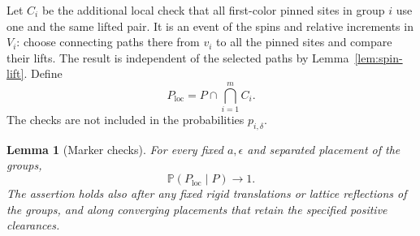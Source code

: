 \documentclass[11pt]{article}
\newcommand{\Prob}{\mathbb P}
\newtheorem{lemma}[theorem]{Lemma}
\theoremstyle{definition}
\theoremstyle{remark}
\numberwithin{equation}{section}
\begin{document}
Let $C_i$ be the additional local check that all first-color pinned
sites in group $i$ use one and the same lifted pair.  It is an event
of the spins and relative increments in $V_i$: choose connecting paths
there from $v_i$ to all the pinned sites and compare their lifts.
The result is independent of the selected paths by
Lemma~\ref{lem:spin-lift}.  Define
\begin{equation}\label{pins:checked-event}
 P_{\mathrm{loc}}=P\cap\bigcap_{i=1}^m C_i.
\end{equation}
The checks are not included in the probabilities $p_{i,\delta}$.

\begin{lemma}[Marker checks]\label{pins:marker-checks}
For every fixed $a,\epsilon$ and separated placement of the groups,
\begin{equation}\label{pins:check-success}
 \Prob(P_{\mathrm{loc}}\mid P)\longrightarrow1.
\end{equation}
The assertion holds also after any fixed rigid translations or lattice
reflections of the groups, and along converging placements that retain
the specified positive clearances.
\end{lemma}
\end{document}
